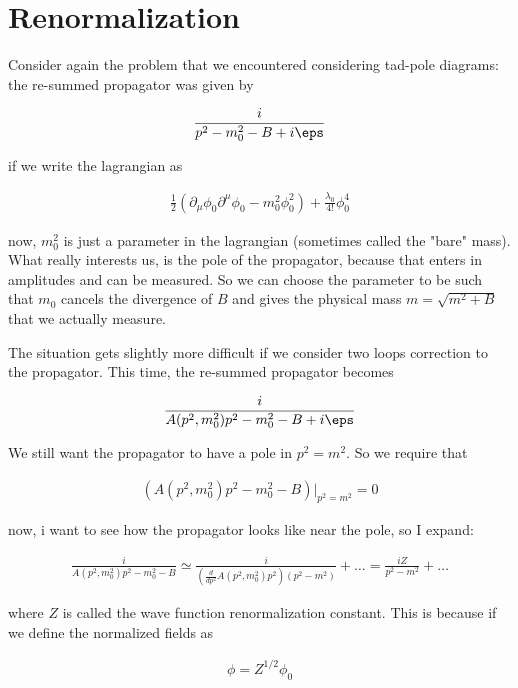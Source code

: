 \documentclass{report}
\begin{document}
\section{Renormalization}

Consider again the problem that we encountered considering tad-pole diagrams: the re-summed propagator was given by 

\begin{align}
    \frac{i}{p^2-m_0^2-B +i\eps}
\end{align}

if we write the lagrangian as 

\begin{align}
    \frac{1}{2}(\partial_\mu\phi_0 \partial^\mu \phi_0 - m_0^2\phi_0^2) + \frac{\lambda_0}{4!}\phi_0^4 
\end{align}

now, \(m_0^2\) is just a parameter in the lagrangian (sometimes called the "bare" mass). What really interests us, is the pole of the propagator, because that enters in amplitudes and can be measured. So we can choose the parameter to be such that \(m_0\) cancels the divergence of \(B\) and gives the physical mass \(m = \sqrt{m^2+B}\) that we actually measure.  

The situation gets slightly more difficult if we consider two loops correction to the propagator. This time, the re-summed propagator becomes 

\begin{align}
    \frac{i}{A(p^2, m_0^2)p^2-m_0^2-B+i\eps}
\end{align}

We still want the propagator to have a pole in \(p^2 =m^2\). So we require that

\begin{align}
    (A(p^2, m_0^2)p^2-m_0^2-B)|_{p^2 =m^2} = 0 
\end{align}

now, i want to see how the propagator looks like near the pole, so I expand: 

\begin{align}
    \frac{i}{A(p^2, m_0^2)p^2-m_0^2-B} \simeq \frac{i}{(\frac{d}{dp^2}A(p^2, m_0^2)p^2)(p^2-m^2)} + \ldots = \frac{iZ}{p^2-m^2} + \ldots
\end{align}

where \(Z\) is called the wave function renormalization constant. This is because if we define the normalized fields as 

\begin{align}
    \phi = Z^{1/2}\phi_0 
\end{align}
\end{document}
